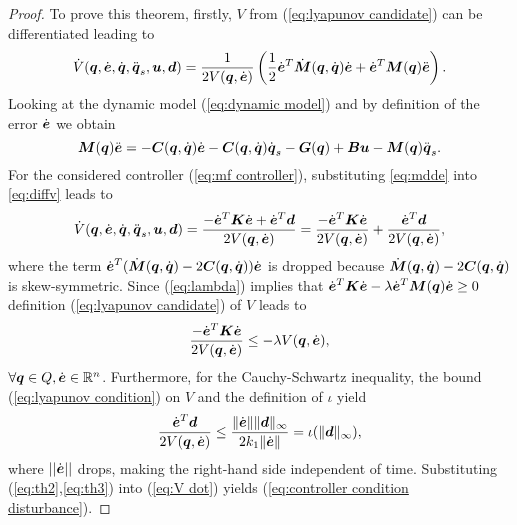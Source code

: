\begin{proof}
    To prove this theorem, firstly,  $V$ from (\ref{eq:lyapunov candidate}) can be differentiated leading to
    \begin{equation}\label{eq:diffv}
        \dot{V}(\qv,\dot{\ev},\dot{\qv},\ddot{\qv}_s,\uv,\dv) = \frac{1}{2 V(\qv,\dot{\ev})} \left( \frac{1}{2}\dot{\ev}^T \dot{\Mm}(\qv, \dqv) \dot{\ev}+\dot{\ev}^T \Mm(\qv) \ddot{\ev} \right).
    \end{equation}
    Looking at the dynamic model (\ref{eq:dynamic model}) and by definition of the error $\dot{\ev}$ we obtain
    \begin{equation}\label{eq:mdde}
     \Mm(\qv)\ddot{\ev}=-\Cm(\qv,\dot{\qv})\dot{\ev}-\Cm(\qv,\dot{\qv})\dot{\qv}_s-\Gm(\qv)+\Bm\uv-\Mm(\qv)\ddot{\qv}_s.
    \end{equation}
    For the considered controller (\ref{eq:mf controller}), substituting \eqref{eq:mdde} into \eqref{eq:diffv} leads to
    \begin{equation} \label{eq:V dot}
        \dot{V}(\qv,\dot{\ev},\dot{\qv},\ddot{\qv}_s,\uv,\dv) = \frac{-\dot{\ev}^T \Km \dot{\ev} + \dot{\ev}^T \dv}{2 V(\qv,\dot{\ev})}=\frac{-\dot{\ev}^T \Km \dot{\ev}}{2 V(\qv,\dot{\ev})}+\frac{\dot{\ev}^T\dv}{2 V(\qv,\dot{\ev})},
    \end{equation}
    where the term $\dot{\ev}^T(\dot{\Mm}(\qv,\dot{\qv})-2\Cm(\qv,\dot{\qv}))\dot{\ev}$ is dropped because $\dot{\Mm}(\qv,\dot{\qv})-2\Cm(\qv,\dot{\qv})$ is skew-symmetric. 
    Since (\ref{eq:lambda}) implies that $\dot{\ev}^T \Km\dot{\ev}-\lambda \dot{\ev}^T \Mm(\qv) \dot{\ev} \geq 0$ definition (\ref{eq:lyapunov candidate}) of $V$ leads to
    \begin{equation} \label{eq:th2}
        \frac{-\dot{\ev}^T \Km\dot{\ev}}{2V(\qv,\dot{\ev})}\leq -\lambda V(\qv,\dot{\ev}),  
    \end{equation}
    $\forall \qv \in Q, \dot{\ev} \in \mathbb{R}^n$. Furthermore, for the Cauchy-Schwartz inequality, the bound (\ref{eq:lyapunov condition}) on $V$ and the definition of $\iota$ yield
    \begin{equation} \label{eq:th3}
        \frac{\dot{\ev}^T\dv}{2V(\qv,\dot{\ev})}\leq \frac{\lVert \dot{\ev}\rVert \lVert \dv \rVert _\infty}{2k_1\lVert \dot{\ev} \rVert}=\iota(\lVert \dv \rVert _\infty),
    \end{equation}
    where $||\dot{\ev}||$ drops, making the right-hand side independent of time. Substituting (\ref{eq:th2},\ref{eq:th3}) into (\ref{eq:V dot}) yields (\ref{eq:controller condition disturbance}).
\end{proof}